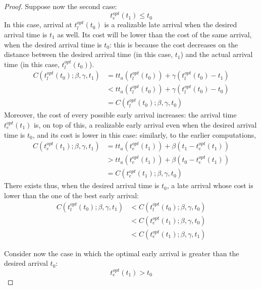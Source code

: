 \begin{proof}
  Suppose now the second case:
  \begin{equation*}
    t_e^{opt}(t_1) \leq t_0
  \end{equation*}
  In this case, arrival at \(t_l^{opt}(t_0)\) is a realizable late arrival when the desired arrival time is \(t_1\) as well.
  Its cost will be lower than the cost of the same arrival,
  when the desired arrival time is \(t_0\):
  this is because the cost decreases on the distance between the desired arrival time (in this case, \(t_1\)) and the actual arrival time (in this case, \(t_l^{opt}(t_0)\)).
  \begin{align*}
    C(t_l^{opt}(t_0); \beta, \gamma, t_1) & = tt_a(t_l^{opt}(t_0)) + \gamma(t_l^{opt}(t_0) - t_1) \\
                                          & < tt_a(t_l^{opt}(t_0)) + \gamma(t_l^{opt}(t_0) - t_0) \\
                                          & = C(t_l^{opt}(t_0); \beta, \gamma, t_0)
  \end{align*}
  Moreover, the cost of every possible early arrival increases:
  the arrival time \(t_e^{opt}(t_1)\) is, on top of this, a realizable early arrival even when the desired arrival time is \(t_0\),
  and its cost is lower in this case:
  similarly, to the earlier computations,
  \begin{align*}
    C(t_e^{opt}(t_1); \beta, \gamma, t_1) & = tt_a(t_e^{opt}(t_1)) + \beta(t_1 - t_e^{opt}(t_1)) \\
                                          & > tt_a(t_e^{opt}(t_1)) + \beta(t_0 - t_e^{opt}(t_1)) \\
                                          & = C(t_e^{opt}(t_1); \beta, \gamma, t_0)
  \end{align*}
  There exists thus, when the desired arrival time is \(t_0\),
  a late arrival whose cost is lower than the one of the best early arrival:
  \begin{align*}
    C(t_l^{opt}(t_0); \beta, \gamma, t_1) & < C(t_l^{opt}(t_0); \beta, \gamma, t_0) \\
                                          & < C(t_e^{opt}(t_1); \beta, \gamma, t_0) \\
                                          & < C(t_e^{opt}(t_1); \beta, \gamma, t_1)
  \end{align*}

  Consider now the case in which the optimal early arrival is greater than the desired arrival \(t_0\):
  \begin{equation*}
    t_e^{opt}(t_1) > t_0
  \end{equation*}


\end{proof}
